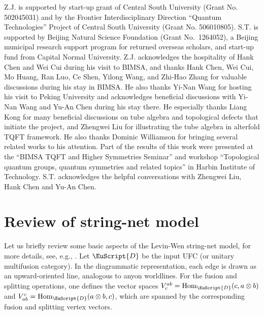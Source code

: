 \documentclass[a4paper,11pt]{article}
\theoremstyle{definition}
\theoremstyle{remark}
\newcommand\eD           {\EuScript{D}}
\newcommand{\Hom}{\operatorname{Hom}}
\begin{document}
\begin{acknowledgments}
Z.J. is supported by start-up grant of Central South University (Grant No. 502045031) and by the Frontier Interdisciplinary Direction ``Quantum Technologies'' Project of Central South University (Grant No. 506010805).
S.T. is supported by Beijing Natural Science Foundation (Grant No.~1264052), a Beijing municipal research support program for returned overseas scholars, and start-up fund from Capital Normal University.
Z.J. acknowledges the hospitality of Hank Chen and Wei Cui during his visit to BIMSA, and thanks Hank Chen, Wei Cui, Mo Huang, Ran Luo, Ce Shen, Yilong Wang, and Zhi-Hao Zhang for valuable discussions during his stay in BIMSA. He also thanks Yi-Nan Wang for hosting his visit to Peking University and acknowledges beneficial discussions with Yi-Nan Wang and Yu-An Chen during his stay there. He especially thanks Liang Kong for many beneficial discussions on tube algebra and topological defects that initiate the project, and Zhengwei Liu for illustrating the tube algebra in alterfold TQFT framework. He also thanks Dominic Williamson for bringing several related works to his attention.
Part of the results of this work were presented at the ``BIMSA TQFT and Higher Symmetries Seminar'' and workshop ``Topological quantum groups, quantum symmetries and related topics'' in Harbin Institute of Technology.
S.T. acknowledges the helpful conversations with Zhengwei Liu, Hank Chen and Yu-An Chen. 


\end{acknowledgments}

\appendix



\section{Review of string-net model}
\label{sec:SNreview}

Let us briefly review some basic aspects of the Levin-Wen string-net model, for more details, see, e.g., \cite{Levin2005,kirillov2011stringnet,lan2014topological,Lin2021generalized,jia2024weakTube,Kitaev2012boundary,hu2018boundary}. Let $\eD$ be the input UFC (or unitary multifusion category). In the diagrammatic representation, each edge is drawn as an upward-oriented line, analogous to anyon worldlines. For the fusion and splitting operations, one defines the vector spaces $V_c^{ab}=\Hom_{\EuScript{D}}(c,a\otimes b)$ and $V_{ab}^c=\Hom_{\EuScript{D}}(a\otimes b,c)$, which are spanned by the corresponding fusion and splitting vertex vectors. 
\end{document}
